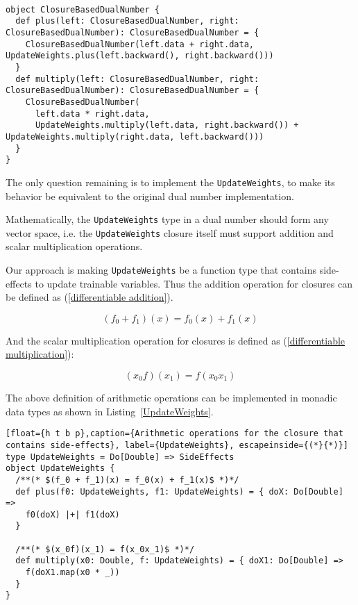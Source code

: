 \begin{lstlisting}[float={h t b p},caption={Replacing operations on \lstinline{PartialDelta} to custom functions for \lstinline{UpdateWeights}}, label={object ClosureBasedDualNumber}]  

object ClosureBasedDualNumber {
  def plus(left: ClosureBasedDualNumber, right: ClosureBasedDualNumber): ClosureBasedDualNumber = {
    ClosureBasedDualNumber(left.data + right.data, UpdateWeights.plus(left.backward(), right.backward()))
  }
  def multiply(left: ClosureBasedDualNumber, right: ClosureBasedDualNumber): ClosureBasedDualNumber = {
    ClosureBasedDualNumber(
      left.data * right.data,
      UpdateWeights.multiply(left.data, right.backward()) + UpdateWeights.multiply(right.data, left.backward()))
  }
}
\end{lstlisting}

The only question remaining is to implement the \lstinline{UpdateWeights}, to make its behavior be equivalent to the original dual number implementation.

Mathematically, the \lstinline{UpdateWeights} type in a dual number should form any vector space, i.e. the \lstinline{UpdateWeights} closure itself must support addition and scalar multiplication operations.

Our approach is making \lstinline{UpdateWeights} be a function type that contains side-effects to update \glspl{trainable variable}.  Thus the addition operation for closures can be defined as (\ref{differentiable addition}).

\begin{equation}
\label{differentiable addition}
(f_0 + f_1)(x) = f_0(x) + f_1(x)
\end{equation}

And the scalar multiplication operation for closures is defined as (\ref{differentiable multiplication}):

\begin{equation}
\label{differentiable multiplication}
(x_0f)(x_1) = f(x_0x_1)
\end{equation}

The above definition of arithmetic operations can be implemented in monadic data types as shown in Listing~\ref{UpdateWeights}.

\begin{lstlisting}[float={h t b p},caption={Arithmetic operations for the closure that contains side-effects}, label={UpdateWeights}, escapeinside={(*}{*)}]
type UpdateWeights = Do[Double] => SideEffects
object UpdateWeights {
  /**(* $(f_0 + f_1)(x) = f_0(x) + f_1(x)$ *)*/
  def plus(f0: UpdateWeights, f1: UpdateWeights) = { doX: Do[Double] =>
    f0(doX) |+| f1(doX)
  }

  /**(* $(x_0f)(x_1) = f(x_0x_1)$ *)*/
  def multiply(x0: Double, f: UpdateWeights) = { doX1: Do[Double] =>
    f(doX1.map(x0 * _))
  }
}
\end{lstlisting}


